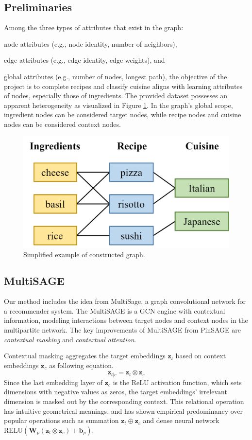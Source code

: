 \subsection{Preliminaries}

Among the three types of attributes that exist in the graph:
\bit
    \item node attributes (e.g., node identity, number of neighbors),
    \item edge attributes (e.g., edge identity, edge weights), and
    \item global attributes (e.g., number of nodes, longest path),
\eit
the objective of the project is to complete recipes and classify cuisine aligns with learning attributes of nodes, especially those of ingredients.
The provided dataset possesses an apparent heterogeneity as visualized in Figure \ref{fig:tripartite}.
In the graph's global scope, ingredient nodes can be considered target nodes, while recipe nodes and cuisine nodes can be considered context nodes.

\begin{figure}[btp!]
    \centering
    \includegraphics[width=0.6\linewidth]{FIG/tripartite.png}
    \caption{\label{fig:tripartite}Simplified example of constructed graph.}
\end{figure}

\subsection{MultiSAGE}

Our method includes the idea from MultiSage, a graph convolutional network for a recommender system.
The MultiSAGE\cite{10.1145/3394486.3403293} is a GCN engine with contextual information, modeling interactions between target nodes and context nodes in the multipartite network.
The key improvements of MultiSAGE from PinSAGE are \emph{contextual masking} and \emph{contextual attention}.

Contextual masking aggregates the target embeddings $\mathbf{z}_t$ based on context embeddings $\mathbf{z}_c$ as following equation.
\begin{equation}
    \mathbf{z}_{t|c} = \mathbf{z}_t \otimes \mathbf{z}_c
\end{equation}
Since the last embedding layer of $\mathbf{z}_c$ is the ReLU activation function, which sets dimensions with negative values as zeros, the target embeddings' irrelevant dimension is masked out by the corresponding context. This relational operation has intuitive geometrical meanings, and has shown empirical predominancy over popular operations such as summation $\mathbf{z}_t \oplus \mathbf{z}_c$ and dense neural network $\text{RELU}(\mathbf{W}_p(\mathbf{z}_t \otimes \mathbf{z}_c) + \mathbf{b}_p)$.

